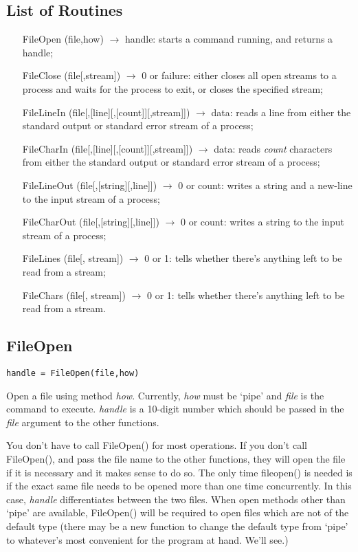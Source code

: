 \documentclass{article}
\begin{document}
\subsection{List of Routines}

\begin{enumerate}

\item[FileOpen](file,how) $\rightarrow$ handle: starts a command
running, and returns a handle;
\item[FileClose](file[,stream]) $\rightarrow$ 0 or failure: either
closes all open streams to a process and waits for the process to exit,
or closes the specified stream;
\item[FileLineIn](file[,[line][,[count]][,stream]]) $\rightarrow$ data:
reads a line from either the standard output or standard error stream of
a process;
\item[FileCharIn](file[,[line][,[count]][,stream]]) $\rightarrow$ data:
reads {\it count} characters from either the standard output or standard error stream of
a process;
\item[FileLineOut](file[,[string][,line]]) $\rightarrow$ 0 or count:
writes a string and a new-line to the input stream of a process;
\item[FileCharOut](file[,[string][,line]]) $\rightarrow$ 0 or count:
writes a string to the input stream of a process;
\item[FileLines](file[, stream]) $\rightarrow$ 0 or 1: tells whether
there's anything left to be read from a stream;
\item[FileChars](file[, stream]) $\rightarrow$ 0 or 1: tells whether
there's anything left to be read from a stream.

\end{enumerate}


\subsection{FileOpen}

\begin{verbatim}
handle = FileOpen(file,how)
\end{verbatim}

Open a file using method {\it how}.  Currently, {\it how} must be `pipe'
and {\it file} is the command to execute.
{\it handle} is a 10-digit number which should be passed in the {\it
file} argument to the other functions.

You don't have to call FileOpen() for most operations.
If you don't call FileOpen(), and pass the file name to the other functions,
they will open the file if it is necessary and it makes sense to do so.
The only time fileopen()
is needed is if the exact same file needs to be opened more than
one time concurrently. In this case, {\it  handle} differentiates between
the two files. When open methods other than `pipe' are available,
FileOpen() will be required to open files which are not of the default
type (there may be a new function to change the default type from `pipe'
to whatever's most convenient for the program at hand. We'll see.)
\end{document}
